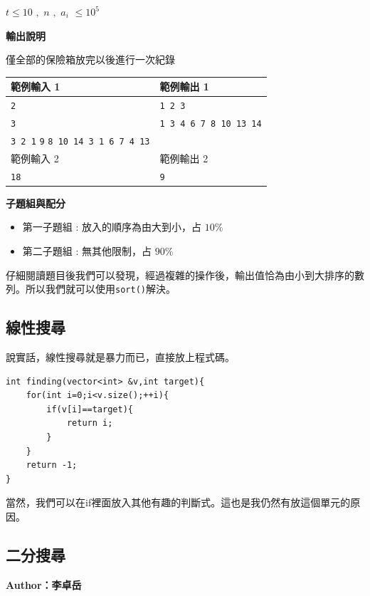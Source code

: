     $t \leq 10$ $,$ $n$ $,$ $a_i$ $\leq 10^5$

    \textbf{輸出說明}

    僅全部的保險箱放完以後進行一次紀錄
    
    \begin{tabular}{|m{7cm}|m{7cm}|}
        \hline
        範例輸入 1 & 範例輸出 1 \\
        \hline
        \verb|2|        &  \verb|1 2 3| \\
        \verb|3|        &  \verb|1 3 4 6 7 8 10 13 14| \\
        \verb|3 2 1|
        \verb|9|  
        \verb|8 10 14 3 1 6 7 4 13|\\
        \hline
        範例輸入 2 & 範例輸出 2 \\
        \hline
        \verb|18| &  \verb|9| \\
        \hline
    \end{tabular}

    \textbf{子題組與配分}

    \begin{itemize}
        \item 第一子題組 : 放入的順序為由大到小，占 $10\%$
        \item 第二子題組 : 無其他限制，占 $90\%$
    \end{itemize}

    仔細閱讀題目後我們可以發現，經過複雜的操作後，輸出值恰為由小到大排序的數列。所以我們就可以使用\verb|sort()|解決。

    \subsection{線性搜尋}

    說實話，線性搜尋就是暴力而已，直接放上程式碼。

\begin{lstlisting}[caption=線性搜尋]
int finding(vector<int> &v,int target){
    for(int i=0;i<v.size();++i){
        if(v[i]==target){
            return i;
        }
    }
    return -1;
}
\end{lstlisting}

    當然，我們可以在if裡面放入其他有趣的判斷式。這也是我仍然有放這個單元的原因。

    \subsection{二分搜尋}
    \textbf{Author：李卓岳}
    \author{李卓岳}

